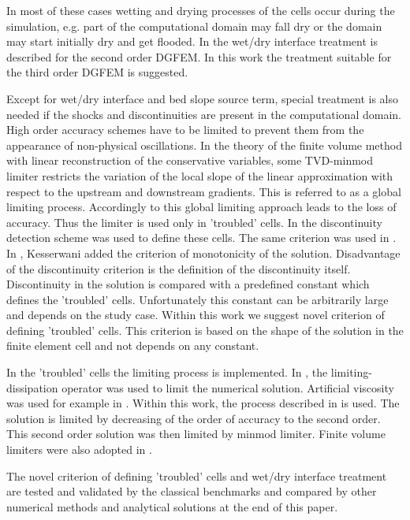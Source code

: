 In most of these cases wetting and drying processes of the cells occur
during the simulation, e.g. part of the computational domain may fall
dry or the domain may start initially dry and get flooded.   In
\cite{Vater20151} the wet/dry interface treatment is described for the
second order DGFEM. In this work the treatment suitable for the third
order DGFEM is suggested.


Except for wet/dry interface and bed slope source term, special
treatment is also needed if the shocks and discontinuities are present
in the computational domain. High order accuracy schemes have to be
limited to prevent them from the appearance of non-physical
oscillations. In the theory of the finite volume method with linear
reconstruction of the conservative variables, some TVD-minmod limiter
restricts the variation of the local slope of the linear approximation
with respect to the upstream and downstream gradients. This is
referred to as a global limiting process. Accordingly to
\cite{krivodonova2004,shu2005} this global limiting approach leads to
the loss of accuracy. Thus the limiter is used only in 'troubled'
cells. In \cite{krivodonova2004} the discontinuity detection scheme
was used to define these cells. The same criterion was used in
\cite{Ambati2007452}. In \cite{kesserwani2015}, Kesserwani added the
criterion of monotonicity of the solution. Disadvantage of the
discontinuity criterion is the definition of the discontinuity
itself. Discontinuity in the solution is compared with a predefined
constant which defines the 'troubled' cells. Unfortunately this
constant can be arbitrarily large and depends on the study case.
Within this work we suggest novel criterion of defining 'troubled'
cells. This criterion is based on the shape of the solution in the
finite element cell and not depends on any constant.

In the 'troubled' cells the limiting process is implemented. In
\cite{JAFFRE1995,Ambati2007452}, the limiting-dissipation operator was
used to limit the numerical solution. Artificial viscosity was used
for example in \cite{cesenek2013, bublik2011,Bublik2015329}. Within
this work, the process described in \cite{Cockburn1989b} is used. The
solution is limited by decreasing of the order of accuracy to the
second order. This second order solution was then limited by minmod
limiter. Finite volume limiters were also adopted in \cite{yang2009}.

The novel criterion of defining 'troubled' cells and wet/dry interface
treatment are tested and validated by the classical benchmarks and
compared by other numerical methods and analytical solutions at the
end of this paper.
